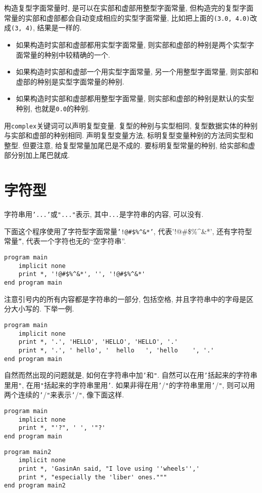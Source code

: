 构造复型字面常量时, 是可以在实部和虚部用整型字面常量, 但构造完的复型字面常量的实部和虚部都会自动变成相应的实型字面常量, 比如把上面的\texttt{(3.0, 4.0)}改成\texttt{(3, 4)}, 结果是一样的.
\begin{itemize}
    \item 如果构造时实部和虚部都用实型字面常量, 则实部和虚部的种别是两个实型字面常量的种别中较精确的一个.
    \item 如果构造时实部和虚部一个用实型字面常量, 另一个用整型字面常量, 则实部和虚部的种别是实型字面常量的种别.
    \item 如果构造时实部和虚部都用整型字面常量, 则实部和虚部的种别是默认的实型种别, 也就是\texttt{0.0}的种别.
\end{itemize}

用\texttt{complex}关键词可以声明复型变量. 复型的种别与实型相同, 复型数据实体的种别与实部和虚部的种别相同. 声明复型变量方法, 标明复型变量种别的方法同实型和整型. 但要注意, 给复型常量加尾巴是不成的. 要标明复型常量的种别, 给实部和虚部分别加上尾巴就成.

\section{字符型}\label{fortran_char}

字符串用\texttt{'...'}或\texttt{"..."}表示, 其中\texttt{...}是字符串的内容, 可以没有.

下面这个程序使用了字符型字面常量\texttt{'!@\#{}\${}\%{}\^{}\&{}*'}, 代表'!@\#{}\${}\%{}\^{}\&{}*', 还有字符型常量\texttt{''}, 代表一个字符也无的``空字符串''.
\begin{lstlisting}
program main
    implicit none
    print *, '!@#$%^&*', '', '!@#$%^&*'
end program main
\end{lstlisting}

注意引号内的所有内容都是字符串的一部分, 包括空格, 并且字符串中的字母是区分大小写的. 下举一例.
\begin{lstlisting}
program main
    implicit none
    print *, '.', 'HELLO', 'HELLO', 'HELLO', '.'
    print *, '.', ' hello', '  hello   ', 'hello    ', '.'
end program main
\end{lstlisting}

自然而然出现的问题就是, 如何在字符串中加\texttt{'}和\texttt{"}. 自然可以在用\texttt{'}括起来的字符串里用\texttt{"}, 在用\texttt{"}括起来的字符串里用\texttt{'}. 如果非得在用\texttt{'}/\texttt{"}的字符串里用\texttt{'}/\texttt{"}, 则可以用两个连续的\texttt{'}/\texttt{"}来表示\texttt{'}/\texttt{"}, 像下面这样.
\begin{lstlisting}
program main
    implicit none
    print *, "'?", ' ', '"?'
end program main
\end{lstlisting}
\begin{lstlisting}
program main2
    implicit none
    print *, 'GasinAn said, "I love using ''wheels'','
    print *, "especially the 'liber' ones."""
end program main2
\end{lstlisting}

